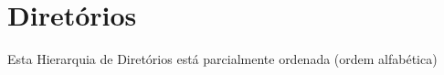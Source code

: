 \section{Diretórios}
Esta Hierarquia de Diretórios está parcialmente ordenada (ordem alfabética)\begin{DoxyCompactList}
\item {}
\begin{DoxyCompactList}
\item {}
\begin{DoxyCompactList}
\item {}
\begin{DoxyCompactList}
\item {}
\end{DoxyCompactList}
\end{DoxyCompactList}
\end{DoxyCompactList}
\end{DoxyCompactList}
